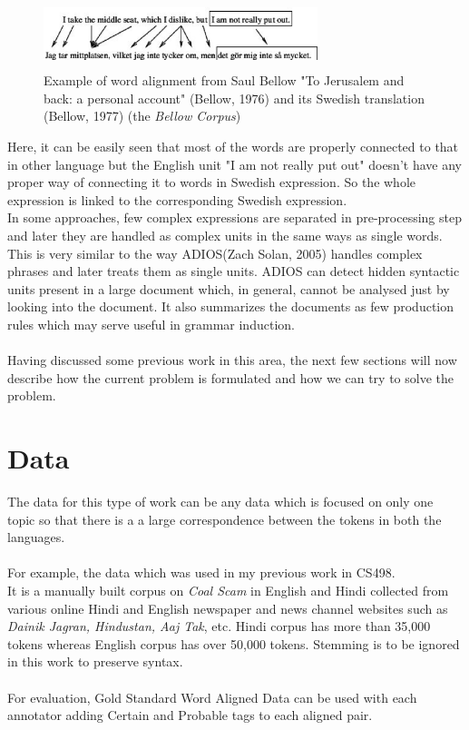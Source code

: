 \documentclass{article}
\begin{document}
\begin{figure}[h!tb]
\centering
\includegraphics[width=8cm,height=2cm]{1.eps}
\caption {Example of word alignment from Saul Bellow "To Jerusalem and back: a personal account" (Bellow, 1976) and its Swedish translation (Bellow, 1977) (the \emph{Bellow Corpus})}
\end{figure}

Here, it can be easily seen that most of the words are properly connected to that in other language but the English unit "I am not really put out" doesn't have any proper way of connecting it to words in Swedish expression. So the whole expression is linked to the corresponding Swedish expression.\\
In some approaches, few complex expressions are separated in pre-processing step and later they are handled as complex units in the same ways as single words. This is very similar to the way ADIOS(Zach Solan, 2005) handles complex phrases and later treats them as single units. ADIOS can detect hidden syntactic units present in a large document which, in general, cannot be analysed just by looking into the document. It also summarizes the documents as few production rules which may serve useful in grammar induction.\\\\
Having discussed some previous work in this area, the next few sections will now describe how the current problem is formulated and how we can try to solve the problem.

\section{Data}
The data for this type of work can be any data which is focused on only one topic so that there is a a large correspondence between the tokens in both the languages.\\\\
For example, the data which was used in my previous work in CS498.\\
It is a manually built corpus on \emph{Coal Scam} in English and Hindi collected from various online Hindi and English newspaper and news channel websites such as \emph{Dainik Jagran, Hindustan, Aaj Tak}, etc. Hindi corpus has more than 35,000 tokens whereas English corpus has over 50,000 tokens. Stemming is to be ignored in this work to preserve syntax.\\\\
For evaluation, Gold Standard Word Aligned Data can be used with each annotator adding Certain and Probable tags to each aligned pair.\\
\end{document}
